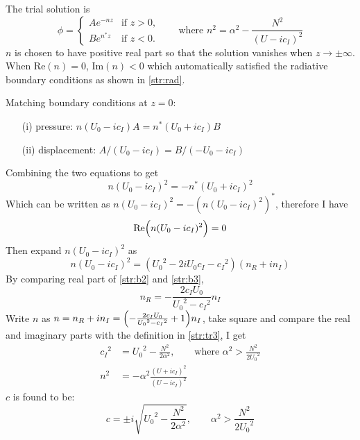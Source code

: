 \begin{enumerate}
The trial solution is
\begin{equation}\label{str:tr3}
\phi =
\begin{cases}
Ae^{-nz} &\text{if $z>0$,}\\
Be^{n^*z} &\text{if $z<0$.}
\end{cases}
\qquad \text{where }n^2=\alpha^2-\frac{N^2}{(U-ic_I)^2}
\end{equation}
$n$ is chosen to have positive real part so that the solution
vanishes when $z \to \pm\infty$. When $\text{Re}(n)=0$,
$\text{Im}(n)<0$ which automatically satisfied the radiative
boundary conditions as shown in \eqref{str:rad}.

Matching boundary conditions at $z=0$:
\begin{enumerate}
  \item[(i)] pressure: $n(U_0-ic_I)A=n^*(U_0+ic_I)B$
  \item[(ii)] displacement: $A/(U_0-ic_I)=B/({-U_0}-ic_I)$
\end{enumerate}
Combining the two equations to get
\begin{equation}\label{str:b1}
    n(U_0-ic_I)^2=-n^*(U_0+ic_I)^2
\end{equation}
Which can be written as $n(U_0-ic_I)^2 = -(n(U_0-ic_I)^2)^*$,
therefore I have
\begin{equation}
    \text{Re}\Bigl(n(U_0-ic_I)^2\Bigr)=0\label{str:b2}
\end{equation}
Then expand $n(U_0-ic_I)^2$ as
\begin{equation}
    n(U_0-ic_I)^2=({U_0}^2-2iU_0c_I-{c_I}^2)(n_R+in_I)\label{str:b3}
\end{equation}
By comparing real part of \eqref{str:b2} and \eqref{str:b3},
\begin{equation}
    n_R=-\frac{2c_IU_0}{{U_0}^2-{c_I}^2}n_I\label{str:b4}
\end{equation}
Write $n$ as
$n=n_R+in_I=\Bigl(-\frac{2c_IU_0}{{U_0}^2-{c_I}^2}+1\Bigr)n_I$, take
square and compare the real and imaginary parts with the definition
in \eqref{str:tr3}, I get
\begin{align}
    {c_I}^2 &={U_0}^2-\frac{N^2}{2\alpha^2},\qquad\text{where }\alpha^2>\frac{N^2}{2{U_0}^2}\label{str:sol1}\\
    n^2 &=-\alpha^2\frac{(U+ic_I)^2}{(U-ic_I)^2}\label{str:sol2}
\end{align}
$c$ is found to be:
\begin{equation}\label{str:c2}
    \boxed{c=\pm
    i\sqrt{{U_0}^2-\frac{N^2}{2\alpha^2}},\qquad\alpha^2>\frac{N^2}{2{U_0}^2}}
\end{equation}
\end{enumerate}

